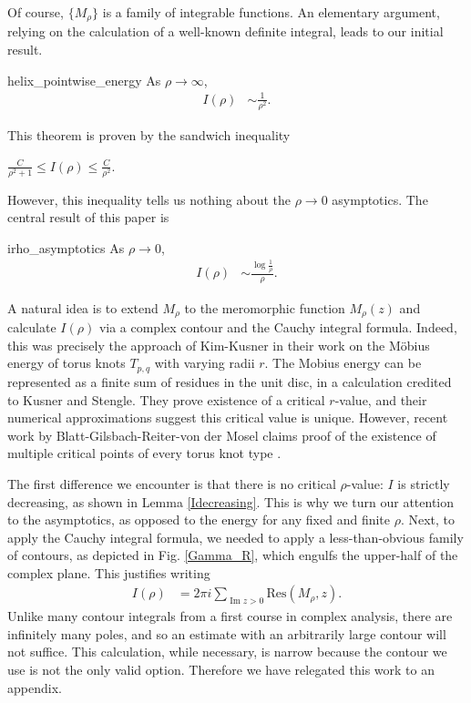 \documentclass{amsart}
\theoremstyle{plain}
\numberwithin{theorem}{section}
\DeclareMathOperator{\Imz}{Im}
\theoremstyle{definition}
\theoremstyle{remark}
\theoremstyle{brakets}
\begin{document}
Of course, $\{M_\rho\}$ is a family of integrable functions. An elementary argument, relying on the calculation of a well-known definite integral, leads to our initial result.
\begin{reptheorem}{helix_pointwise_energy}
As $\rho \to \infty$,
\begin{align*}
    I(\rho) &\sim \frac{1}{\rho^2}.
\end{align*}
\end{reptheorem}
\noindent This theorem is proven by the sandwich inequality
\begin{center}
$\frac{C}{\rho^2 + 1} \leq I(\rho) \leq \frac{C}{\rho^2}$.    
\end{center}
However, this inequality tells us nothing about the $\rho \to 0$ asymptotics. The central result of this paper is
\begin{reptheorem}{irho_asymptotics}
    As $\rho \to 0$,
    \begin{align*}
        I(\rho) &\sim \frac{\log \frac{1}{\rho}}{\rho}.
    \end{align*}
\end{reptheorem}
A natural idea is to extend $M_\rho$ to the meromorphic function $M_\rho(z)$ and calculate $I(\rho)$ via a complex contour and the Cauchy integral formula. Indeed, this was precisely the approach of Kim-Kusner in their work on the M\"obius energy of torus knots $T_{p,q}$ \cite{kusner93} with varying radii $r$. The Mobius energy can be represented as a finite sum of residues in the unit disc, in a calculation credited to Kusner and Stengle. They prove existence of a critical $r$-value, and their numerical approximations suggest this critical value is unique. However, recent work by Blatt-Gilsbach-Reiter-von der Mosel claims proof of the existence of multiple critical points of every torus knot type \cite{blatt25}. 

The first difference we encounter is that there is no critical $\rho$-value: $I$ is strictly decreasing, as shown in Lemma \ref{Idecreasing}. This is why we turn our attention to the asymptotics, as opposed to the energy for any fixed and finite $\rho$. Next, to apply the Cauchy integral formula, we needed to apply a less-than-obvious family of contours, as depicted in Fig. \ref{Gamma_R}, which engulfs the upper-half of the complex plane. This justifies writing
\begin{align*}
    I(\rho) &= 2\pi i \sum\limits_{\Imz z > 0} \text{Res}(M_\rho,z).
\end{align*}
Unlike many contour integrals from a first course in complex analysis, there are infinitely many poles, and so an estimate with an arbitrarily large contour will not suffice. This calculation, while necessary, is narrow because the contour we use is not the only valid option. Therefore we have relegated this work to an appendix.
\end{document}
